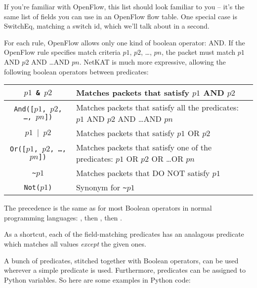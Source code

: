 \bigskip
If you're familiar with OpenFlow, this list should look familiar to you -- it's the same list of fields you can 
use in an OpenFlow flow table.
One special case is SwitchEq, matching a switch id, which we'll talk about in a second.  

For each rule, OpenFlow allows only one kind of boolean operator: AND.  
If the OpenFlow rule specifies match criteria $p1$, $p2$, \ldots, $pn$, the packet must match $p1$ AND $p2$
AND \ldots AND $pn$.  
NetKAT is much more expressive, allowing the following boolean operators between predicates:

\bigskip
\begin{tabularx}{6in}{|c|X|}
\hline\hline
\texttt{$p1$ \& $p2$} & Matches packets that satisfy $p1$ AND $p2$
\\ \hline  
\texttt{And([$p1$, $p2$, \ldots, $pn$])} & 
Matches packets that satisfy all the predicates: $p1$ AND $p2$ AND \ldots AND $pn$
\\ \hline  
\texttt{$p1$ $\vert$ $p2$} & Matches packets that satisfy $p1$ OR $p2$
\\ \hline  
\texttt{Or([$p1$, $p2$, \ldots, $pn$])} & 
Matches packets that satisfy one of the predicates: $p1$ OR $p2$ OR \ldots OR $pn$
\\ \hline  
\texttt{\textasciitilde $p1$} & Matches packets that DO NOT satisfy $p1$
\\ \hline  
\texttt{Not($p1$)} & Synonym for \texttt{\textasciitilde $p1$}
\\ \hline\hline
\end{tabularx}

\bigskip

The precedence is the same as for most Boolean operators in normal programming languages: 
, then , then .  

As a shortcut, each of the field-matching predicates  has an analagous 
predicate which matches all values \emph{except} the given ones.  

A bunch of predicates, stitched together with Boolean operators, can be used wherever a simple predicate is used.
Furthermore, predicates can be assigned to Python variables.
So here are some examples in Python code:

